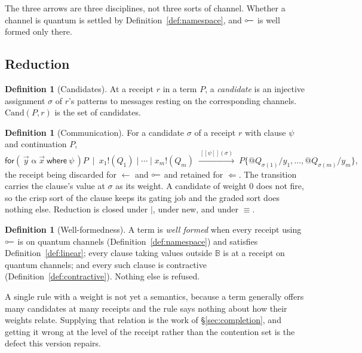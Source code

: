 \documentclass[11pt,a4paper]{article}
\theoremstyle{plain}
\theoremstyle{definition}
\newtheorem{definition}[theorem]{Definition}
\theoremstyle{remark}
\newcommand{\sem}[1]{[\![#1]\!]}
\newcommand{\Bool}{\mathbb{B}}
\newcommand{\scong}{\equiv}
\newcommand{\Cand}{\mathrm{Cand}}
\newcommand{\lolli}{\mathrel{\reflectbox{$\multimap$}}}
\begin{document}
The three arrows are three disciplines, not three sorts of channel. Whether a
channel is quantum is settled by Definition~\ref{def:namespace}, and
$\lolli$ is well formed only there.

\subsection{Reduction}

\begin{definition}[Candidates]\label{def:candsite}
At a receipt $r$ in a term $P$, a \emph{candidate} is an injective assignment
$\sigma$ of $r$'s patterns to messages resting on the corresponding channels.
$\Cand(P,r)$ is the set of candidates.
\end{definition}

\begin{definition}[Communication]\label{def:comm}
For a candidate $\sigma$ of a receipt $r$ with clause $\psi$ and continuation
$P$,
\[
  \textsf{for}(\,\vec{y} \mathbin{\alpha} \vec{x}\ \textsf{where}\ \psi\,)P
  \ \mid\ x_1!(Q_1) \mid \cdots \mid x_m!(Q_m)
  \;\xrightarrow{\ \sem{\psi}(\sigma)\ }\;
  P\{@Q_{\sigma(1)}/y_1,\dots,@Q_{\sigma(m)}/y_m\},
\]
the receipt being discarded for $\leftarrow$ and $\lolli$ and retained for
$\Leftarrow$. The transition carries the clause's value at $\sigma$ as its
weight. A candidate of weight $0$ does not fire, so the crisp sort of the clause
keeps its gating job and the graded sort does nothing else. Reduction is closed
under $\mid$, under \textsf{new}, and under $\scong$.
\end{definition}

\begin{definition}[Well-formedness]\label{def:wf}
A term is \emph{well formed} when every receipt using $\lolli$ is on quantum
channels (Definition~\ref{def:namespace}) and satisfies
Definition~\ref{def:linear}; every clause taking values outside $\Bool$ is at a
receipt on quantum channels; and every such clause is contractive
(Definition~\ref{def:contractive}). Nothing else is refused.
\end{definition}

A single rule with a weight is not yet a semantics, because a term generally
offers many candidates at many receipts and the rule says nothing about how
their weights relate. Supplying that relation is the work of
\S\ref{sec:completion}, and getting it wrong at the level of the receipt rather
than the contention set is the defect this version repairs.
\end{document}
